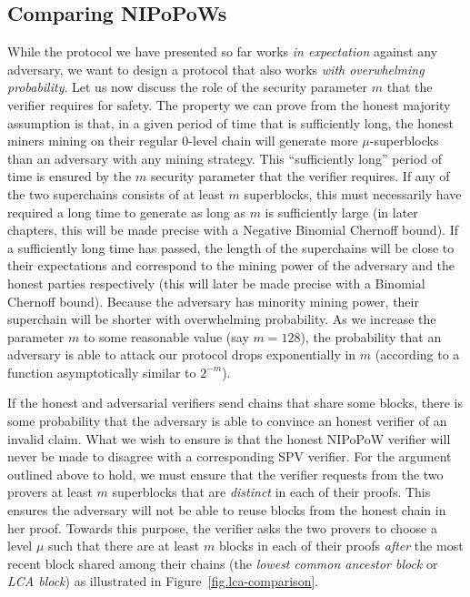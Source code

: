 \subsection{Comparing NIPoPoWs}
While the protocol we have presented so far works \emph{in expectation} against
any adversary, we want to design a protocol that also works \emph{with
overwhelming probability}.  Let us now discuss the role of the security
parameter $m$ that the verifier requires for safety. The property we can prove
from the honest majority assumption is that, in a given period of time that is
sufficiently long, the honest miners mining on their regular $0$-level chain
will generate more $\mu$-superblocks than an adversary with any mining strategy.
This ``sufficiently long'' period of time is ensured by the $m$ security
parameter that the verifier requires. If any of the two superchains consists of
at least $m$ superblocks, this must necessarily have required a long time to
generate as long as $m$ is sufficiently large (in later chapters, this will be
made precise with a Negative Binomial Chernoff bound). If a sufficiently long
time has passed, the length of the superchains will be close to their
expectations and correspond to the mining power of the adversary and the honest
parties respectively (this will later be made precise with a Binomial Chernoff
bound). Because the adversary has minority mining power, their superchain will
be shorter with overwhelming probability. As we increase the parameter $m$ to
some reasonable value (say $m = 128$), the probability that an adversary is able
to attack our protocol drops exponentially in $m$ (according to a function
asymptotically similar to $2^{-m}$).

If the honest and adversarial verifiers send chains that share some blocks,
there is some probability that the adversary is able to convince an honest
verifier of an invalid claim. What we wish to ensure is that the honest NIPoPoW
verifier will never be made to disagree with a corresponding SPV verifier. For
the argument outlined above to hold, we must ensure that the verifier requests
from the two provers at least $m$ superblocks that are \emph{distinct} in each
of their proofs. This ensures the adversary will not be able to reuse blocks
from the honest chain in her proof. Towards this purpose, the verifier asks the
two provers to choose a level $\mu$ such that there are at least $m$ blocks in
each of their proofs \emph{after} the most recent block shared among their
chains (the \emph{lowest common ancestor block} or \emph{LCA block}) as
illustrated in Figure~\ref{fig.lca-comparison}.

